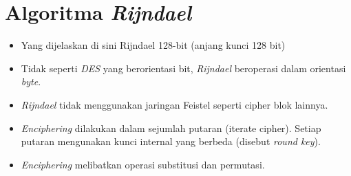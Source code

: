 \documentclass{article}
\begin{document}

\section*{Algoritma \textit{Rijndael}}

\begin{itemize}
    \item Yang dijelaskan di sini Rijndael 128-bit (anjang kunci 128 bit)
    \item Tidak seperti \textit{DES} yang berorientasi bit, \textit{Rijndael} beroperasi dalam orientasi \textit{byte}.
    \item \textit{Rijndael} tidak menggunakan jaringan Feistel seperti cipher blok lainnya.
    \item \textit{Enciphering} dilakukan dalam sejumlah putaran (iterate cipher). Setiap putaran mengunakan kunci internal yang berbeda (disebut \textit{round key}).
    \item \textit{Enciphering} melibatkan operasi substitusi dan permutasi.
\end{itemize}
\end{document}
